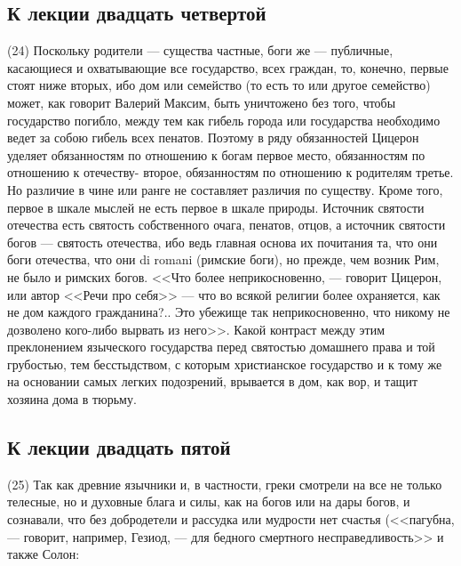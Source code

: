 \documentclass[12pt]{article}
\begin{document}
\subsection*{К лекции двадцать четвертой}

(24) Поскольку родители --- существа частные, боги же --- публичные, касающиеся и охватывающие все государство, всех граждан, то, конечно, первые стоят ниже вторых, ибо дом или семейство (то есть то или другое семейство) может, как говорит Валерий Максим, быть уничтожено без того, чтобы государство погибло, между тем как гибель города или государства необходимо ведет за собою гибель всех пенатов. Поэтому в ряду обязанностей Цицерон уделяет обязанностям по отношению к богам первое место, обязанностям по отношению к отечеству- второе, обязанностям по отношению к родителям третье. Но различие в чине или ранге не составляет различия по существу. Кроме того, первое в шкале мыслей не есть первое в шкале природы. Источник святости отечества есть святость собственного очага, пенатов, отцов, а источник святости богов --- святость отечества, ибо ведь главная основа их почитания та, что они боги отечества, что они di romani (римские боги), но прежде, чем возник Рим, не было и римских богов. <<Что более неприкосновенно, --- говорит Цицерон, или автор <<Речи про себя>>  --- что во всякой религии более охраняется, как не дом каждого гражданина?.. Это убежище так неприкосновенно, что никому не дозволено кого-либо вырвать из него>>. Какой контраст между этим преклонением языческого государства перед святостью домашнего права и той грубостью, тем бесстыдством, с которым христианское государство и к тому же на основании самых легких подозрений, врывается в дом, как вор, и тащит хозяина дома в тюрьму. 

\subsection*{К лекции двадцать пятой}

(25) Так как древние язычники и, в частности, греки смотрели на все не только телесные, но и духовные блага и силы, как на богов или на дары богов, и сознавали, что без добродетели и рассудка или мудрости нет счастья (<<пагубна, --- говорит, например, Гезиод, --- для бедного смертного несправедливость>>  и также Солон: 
\end{document}
